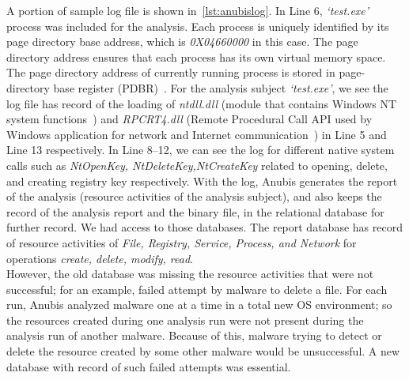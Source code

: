 A portion of sample log file is shown in~\autoref{lst:anubislog}.
In Line 6, \emph{`test.exe'} process was included for the analysis.
Each process is uniquely identified by its page directory base address, which is \emph{0X04660000} in this case. %
The page directory address ensures that each process has its own virtual memory space.
The page directory address of currently running process is stored in page-directory base register (PDBR)~\cite[]{ttanalyze}.
For the analysis subject \emph{`test.exe'}, we see the log file has record of the loading of \emph{ntdll.dll} (module that contains Windows NT system functions~\cite[]{ntdll}) and \emph{RPCRT4.dll} (Remote Procedural Call API used by Windows application for network and Internet communication~\cite[]{rpcrt}) in Line 5 and Line 13 respectively.
In Line 8--12, we can see the log for different native system calls such as \emph{NtOpenKey, NtDeleteKey,NtCreateKey} related to opening, delete, and creating registry key respectively.
With the log, Anubis generates the report of the analysis (resource activities of the analysis subject), and also keeps the record of the analysis report and the binary file, in the relational database for further record.
We had access to those databases.
The report database has record of resource activities of \emph{File, Registry, Service, Process, and Network} for operations \emph{create, delete, modify, read}.\\

However, the old database was missing the resource activities that were not successful; for an example, failed attempt by malware to delete a file.
For each run, Anubis analyzed malware one at a time in a total new OS environment; so the resources created during one analysis run were not present during the analysis run of another malware.
Because of this, malware trying to detect or delete the resource created by some other malware would be unsuccessful.
A new database with record of such failed attempts was essential.\\

